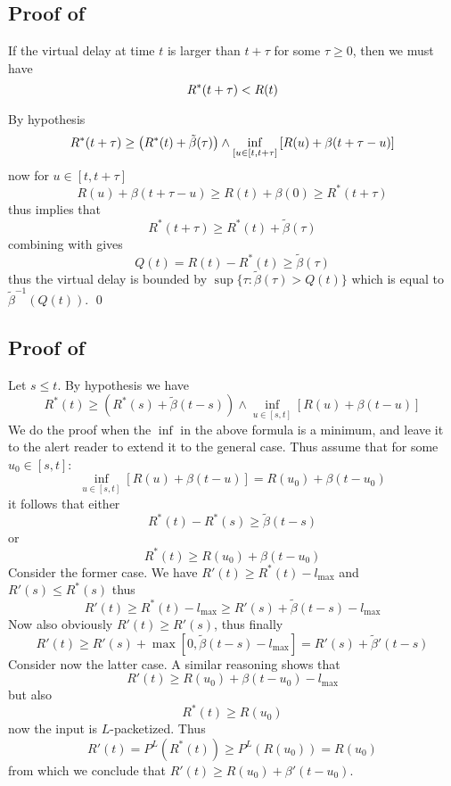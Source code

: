 \subsection{Proof of }
If the virtual delay at time $t$ is larger than $t+ \tau$ for
some $\tau \geq 0$, then we must have
\begin{equation}\mylabel{eq-ascdel01}
  R^*(t+ \tau) < R(t)
\end{equation}

By hypothesis
\begin{equation}\mylabel{eq-ascdel1}
 R^*(t + \tau) \geq \left(R^*(t) + \tilde{\beta} (\tau) \right)
\wedge \inf_{[u \in[t, t + \tau]} \left[ R(u) + \beta(t+
\tau-u)\right]
\end{equation}
now for $u \in[t, t + \tau]$
$$
 R(u) + \beta(t+\tau-u) \geq R(t) + \beta(0) \geq R^*(t + \tau)
$$
thus  implies that
$$
R^*(t + \tau) \geq R^*(t) + \tilde{\beta} (\tau)
$$
combining with  gives
$$
Q(t)=R(t)-R^*(t) \geq \tilde{\beta} (\tau)
$$
thus the virtual delay is bounded by $\sup\{\tau:
\tilde{\beta}(\tau) > Q(t) \}$ which is equal to
$\tilde{\beta}^{-1}(Q(t))$. \qed


\subsection{Proof of }
 \pr
 Let $s \leq t$. By hypothesis we have
 $$
R^*(t) \geq \left( R^*(s) + \tilde{\beta}(t-s)\right)  \wedge
\inf_{u \in [s,t]}[R(u)+\beta(t-u)]
 $$
 We do the proof when the $\inf$ in the above formula is a
 minimum, and leave it to the alert reader to extend it to the
 general case. Thus assume that for some $u_0 \in [s,t]$:
 $$
\inf_{u \in [s,t]}[R(u)+\beta(t-u)] = R(u_0) +  \beta(t-u_0)
 $$
it follows that either
$$ R^*(t) - R^*(s) \geq \tilde{\beta}(t-s)
$$
or
$$
R^*(t) \geq R(u_0) + \beta(t-u_0)
$$
Consider the former case. We have $R'(t) \geq R^*(t) -
l_{\max}$ and $R'(s) \leq R^*(s)$ thus
$$ R'(t) \geq R^*(t) - l_{\max} \geq R'(s) + \tilde{\beta}(t-s) - l_{\max}
$$
Now also obviously $R'(t) \geq R'(s)$, thus finally
$$ R'(t) \geq R'(s) +\max[0,  \tilde{\beta}(t-s) -
l_{\max}]=R'(s)+\tilde{\beta}'(t-s)
$$
Consider now the latter case. A similar reasoning shows that
$$ R'(t) \geq R(u_0) + \beta(t-u_0) - l_{\max}
$$
but also
$$
R^*(t) \geq R(u_0)
$$
now the input is $L$-packetized. Thus
$$
R'(t)=P^L(R^*(t)) \geq P^L(R(u_0))=R(u_0)
$$
from which we conclude that $R'(t) \geq R(u_0) +
\beta'(t-u_0)$.

